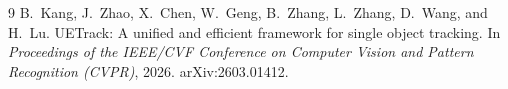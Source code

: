 \documentclass[10pt,twocolumn,letterpaper]{article}
\begin{document}
{\small

\begin{thebibliography}{9}
B.~Kang, J.~Zhao, X.~Chen, W.~Geng, B.~Zhang, L.~Zhang, D.~Wang, and H.~Lu.
\newblock UETrack: A unified and efficient framework for single object tracking.
\newblock In \emph{Proceedings of the IEEE/CVF Conference on Computer Vision and Pattern Recognition (CVPR)}, 2026.
\newblock arXiv:2603.01412.
\end{thebibliography}
}
\end{document}
